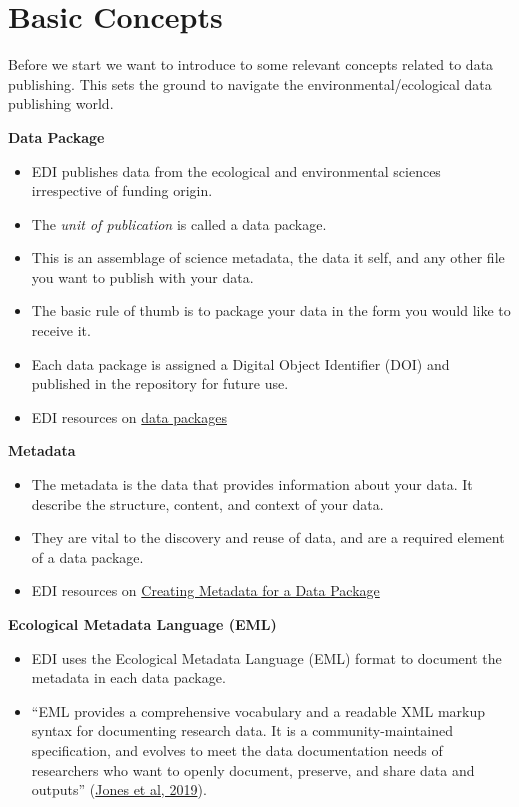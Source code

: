 \documentclass[
  letterpaper,
  DIV=11,
  numbers=noendperiod]{scrreprt}
\providecommand{\tightlist}{%
  \setlength{\itemsep}{0pt}\setlength{\parskip}{0pt}}\usepackage{longtable,booktabs,array}
\begin{document}

\hypertarget{basic-concepts}{%
\chapter*{Basic Concepts}\label{basic-concepts}}

Before we start we want to introduce to some relevant concepts related
to data publishing. This sets the ground to navigate the
environmental/ecological data publishing world.

\textbf{Data Package}

\begin{itemize}
\item
  EDI publishes data from the ecological and environmental sciences
  irrespective of funding origin.
\item
  The \emph{unit of publication} is called a data package.
\item
  This is an assemblage of science metadata, the data it self, and any
  other file you want to publish with your data.
\item
  The basic rule of thumb is to package your data in the form you would
  like to receive it.
\item
  Each data package is assigned a Digital Object Identifier (DOI) and
  published in the repository for future use.
\item
  EDI resources on
  \href{https://edirepository.org/resources/the-data-package}{data
  packages}
\end{itemize}

\textbf{Metadata}

\begin{itemize}
\tightlist
\item
  The metadata is the data that provides information about your data. It
  describe the structure, content, and context of your data.
\item
  They are vital to the discovery and reuse of data, and are a required
  element of a data package.
\item
  EDI resources on
  \href{https://edirepository.org/resources/creating-metadata-for-publication}{Creating
  Metadata for a Data Package}
\end{itemize}

\textbf{Ecological Metadata Language (EML)}

\begin{itemize}
\tightlist
\item
  EDI uses the Ecological Metadata Language (EML) format to document the
  metadata in each data package.
\item
  ``EML provides a comprehensive vocabulary and a readable XML markup
  syntax for documenting research data. It is a community-maintained
  specification, and evolves to meet the data documentation needs of
  researchers who want to openly document, preserve, and share data and
  outputs'' (\href{https://eml.ecoinformatics.org/}{Jones et al, 2019}).
\end{itemize}
\end{document}
